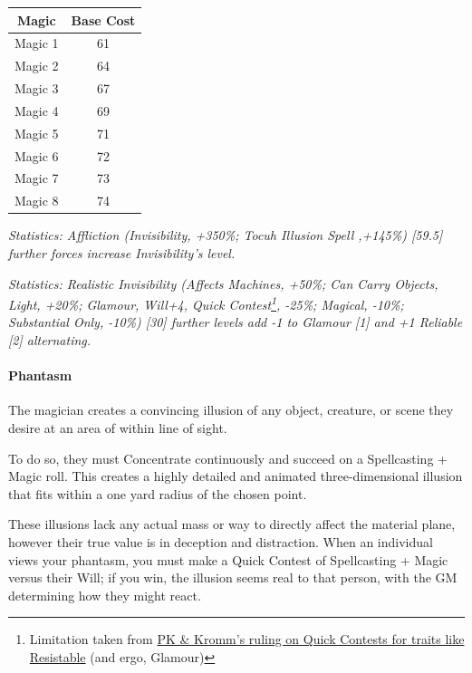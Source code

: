 \begin{multicols*}{3}
	\begin{center}
		\begin{tabular}{|c|c|}
			\hline
			Magic & Base Cost \\
			\hline
			\hline
			Magic 1 & 61\\
			Magic 2 & 64 \\
			Magic 3 & 67 \\
			Magic 4 & 69 \\
			Magic 5 & 71 \\
			Magic 6 & 72 \\
			Magic 7 & 73 \\
			Magic 8 & 74 \\
			\hline
		\end{tabular}
	\end{center}	
	
	\textcolor{OliveGreen}{\textit{Statistics: Affliction (Invisibility, +350\%; Tocuh Illusion Spell ,+145\%) [59.5]  further forces increase Invisibility's level. }}
	
	\textcolor{OliveGreen}{\textit{Statistics: Realistic Invisibility (Affects Machines, +50\%; Can Carry Objects, Light, +20\%; Glamour, Will+4, Quick Contest\footnote{Limitation taken from \textcolor{Blue}{\href{http://forums.sjgames.com/showpost.php?p=669736&postcount=2}{PK \& Kromm's ruling on Quick Contests for traits like Resistable}} (and ergo, Glamour)}, -25\%; Magical, -10\%; Substantial Only, -10\%) [30] further levels add -1 to Glamour [1] and +1 Reliable [2] alternating.}}
	
	\paragraph{Phantasm}
	
	The magician creates a convincing illusion of any object, creature, or scene they desire at an area of within line of sight.
	
	To do so, they must Concentrate continuously and succeed on a Spellcasting + Magic roll. This creates a highly detailed and animated three-dimensional illusion that fits within a one yard radius of the chosen point.
	
	These illusions lack any actual mass or way to directly affect the material plane, however their true value is in deception and distraction. When an individual views your phantasm, you must make a Quick Contest of Spellcasting + Magic versus their Will; if you win, the illusion seems real to that person, with the GM determining how they might react.
	

\end{multicols*}
